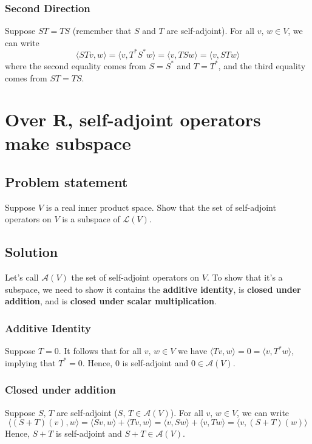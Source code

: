 \documentclass{article}
\begin{document}
\subsubsection*{Second Direction}
Suppose $ST=TS$ (remember that $S$ and $T$ are self-adjoint). For all $v,\,w\in V$, we can write
\[\langle STv,w\rangle=\langle v, T^*S^*w\rangle=\langle v,TSw\rangle=\langle v,STw\rangle\]
where the second equality comes from $S=S^*$ and $T=T^*$, and the third equality comes from $ST=TS$.

\clearpage

\renewcommand{\thesection}{8}
\section{Over $\mathbf{R}$, self-adjoint operators make subspace}
\subsection*{Problem statement}
Suppose $V$ is a real inner product space. Show that the set of self-adjoint operators on $V$ is a subspace of $\mathcal{L}(V)$.

\subsection*{Solution}
Let's call $\mathcal{A}(V)$ the set of self-adjoint operators on $V$. To show that it's a subspace, we need to show it contains the \textbf{additive identity}, is \textbf{closed under addition}, and is \textbf{closed under scalar multiplication}.

\subsubsection*{Additive Identity}
Suppose $T=0$. It follows that for all $v,\,w\in V$ we have $\langle Tv,w\rangle=0=\langle v, T^*w\rangle$, implying that $T^*=0$. Hence, $0$ is self-adjoint and $0\in\mathcal{A}(V)$.

\subsubsection*{Closed under addition}
Suppose $S,\,T$ are self-adjoint ($S,\,T\in\mathcal{A}(V)$). For all $v,\,w\in V$, we can write
\[\langle (S+T)(v),w\rangle=\langle Sv,w\rangle+\langle Tv,w\rangle=\langle v,Sw\rangle+\langle v,Tw\rangle=\langle v,(S+T)(w)\rangle\]
Hence, $S+T$ is self-adjoint and $S+T\in\mathcal{A}(V)$.
\end{document}
